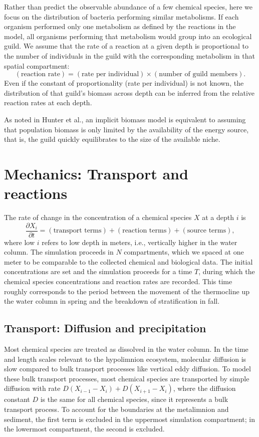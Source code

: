 \documentclass{report}
\begin{document}
Rather than predict the observable abundance of a few chemical species, here we focus on the
distribution of bacteria performing similar metabolisms. If each organism performed only
one metabolism as defined by the reactions in the model, all organisms performing that
metabolism would group into an ecological guild. We assume that the
rate of a reaction at a given depth is proportional to the number of individuals in the guild with the
corresponding metabolism in that spatial compartment:
\begin{equation}
  (\text{reaction rate}) = (\text{rate per individual}) \times (\text{number of guild members}).
\end{equation}
Even if the constant of proportionality (rate per individual) is not known, the distribution of
that guild's biomass across
depth can be inferred from the relative reaction rates at each depth.

As noted in Hunter et al.\cite{hunterkinetic1998}, an implicit biomass model is equivalent to assuming that population
biomass is only limited by the availability of the energy source, that is, the guild
quickly equilibrates to the size of the available niche.

\section{Mechanics: Transport and reactions}
The rate of change in the concentration of a chemical species $X$ at a depth $i$ is
\begin{equation}
  \frac{\partial X_i}{\partial t} = \left( \text{transport terms} \right) + \left(
  \text{reaction terms} \right) + \left(\text{source terms}\right),
\end{equation}
where low $i$ refers to low depth in meters, i.e., vertically higher in the water column.
The simulation proceeds in $N$ compartments, which we spaced at one meter to be comparable
to the collected chemical and biological data. The initial concentrations are set and the
simulation proceeds for a time $T$, during which the chemical species concentrations and
reaction rates are recorded. This time roughly corresponds to the period between the
movement of the thermocline up the water column in spring and the breakdown of
stratification in fall.

\subsection{Transport: Diffusion and precipitation}
Most chemical species are treated as dissolved in the water column. In the time and length scales relevant to the hypolimnion ecosystem, molecular diffusion is slow compared to bulk transport processes like vertical eddy diffusion. To model these bulk transport processes, most chemical species are transported by simple diffusion with rate $D \left(X_{i-1} - X_i\right) + D \left(X_{i+1} - X_i \right)$, where the diffusion constant $D$ is the same for all chemical species, since it represents a bulk transport process. To account for the boundaries at the metalimnion and sediment, the first term is excluded in the uppermost simulation compartment; in the lowermost compartment, the second is excluded.
\end{document}
